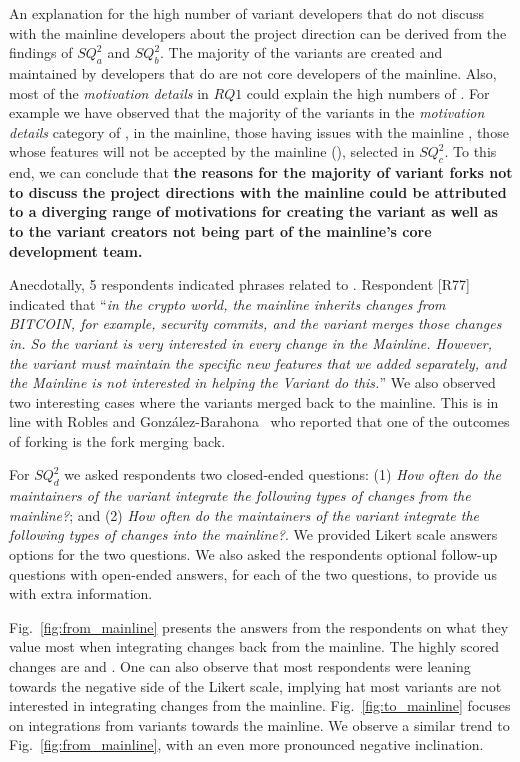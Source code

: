 An explanation for the high number of variant developers that do not discuss with the mainline developers about the project direction can be derived from the findings of $SQ^2_{a}$ and $SQ^2_{b}$. The majority of the variants are created and maintained by developers that do are not core developers of the mainline. Also, most of the \emph{motivation details} in $RQ1$ could explain the high numbers of . For example we have observed that the majority of the variants in the \emph{motivation details} category of ,  in the mainline, those having issues with the mainline , those whose features will not be accepted by the mainline (), selected   in $SQ^2_{c}$. To this end, we can conclude that \textbf{the reasons for the majority of variant forks not to discuss the project directions with the mainline could be attributed to a diverging range of motivations for creating the variant as well as to the variant creators not being part of the mainline's core development team.}

Anecdotally, 5 respondents indicated phrases related to .
Respondent [R77] indicated that ``\emph{in the crypto world, the mainline inherits changes from BITCOIN, for example, security commits, and the variant merges those changes in. So the variant is very interested in every change in the Mainline. However, the variant must maintain the specific new features that we added separately, and the Mainline is not interested in helping the Variant do this.}''
We also observed two interesting cases where the variants merged back to the mainline. This is in line with Robles and Gonz{\'a}lez-Barahona~\cite{Gregorio:2012} who reported that one of the outcomes of forking is the fork merging back.

For $SQ^2_{d}$ we asked respondents two closed-ended questions:
(1) \textit{How often do the maintainers of the variant integrate the following types of changes from the mainline?}; and (2) \textit{How often do the maintainers of the variant integrate the following types of changes into the mainline?}.
%
We provided Likert scale answers options for the two questions. We also asked the respondents optional follow-up questions with open-ended answers, for each of the two questions, to provide us with extra information.

Fig.~\ref{fig:from_mainline} presents the answers from the respondents on what they value most when integrating changes back from the mainline. The highly scored changes are  and .
One can also observe that most respondents were leaning towards the negative side of the Likert scale, implying hat most variants are not interested in integrating changes from the mainline.
Fig.~\ref{fig:to_mainline} focuses on integrations from variants towards the mainline. We observe a similar trend to Fig.~\ref{fig:from_mainline}, with an even more pronounced negative inclination.

